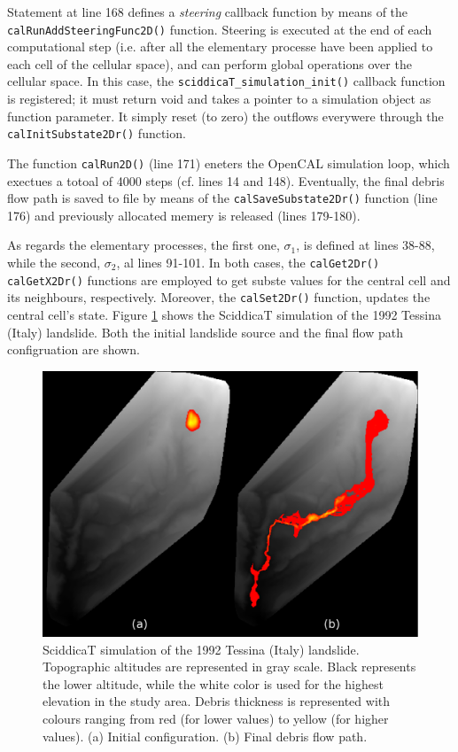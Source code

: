 Statement at line 168 defines a \emph{steering} callback function by
means of the \verb'calRunAddSteeringFunc2D()' function. Steering is
executed at the end of each computational step (i.e. after all the
elementary processe have been applied to each cell of the cellular
space), and can perform global operations over the cellular space. In
this case, the \verb'sciddicaT_simulation_init()' callback function is
registered; it must return void and takes a pointer to a simulation
object as function parameter. It simply reset (to zero) the outflows
everywere through the \verb'calInitSubstate2Dr()' function.

The function \verb'calRun2D()' (line 171) eneters the OpenCAL
simulation loop, which exectues a totoal of 4000 steps (cf. lines 14
and 148). Eventually, the final debris flow path is saved to file by
means of the \verb'calSaveSubstate2Dr()' function (line 176) and
previously allocated memery is released (lines 179-180).

As regards the elementary processes, the first one, $\sigma_1$, is
defined at lines 38-88, while the second, $\sigma_2$, al lines
91-101. In both cases, the \verb'calGet2Dr()' \verb'calGetX2Dr()'
functions are employed to get subste values for the central cell and
its neighbours, respectively. Moreover, the \verb'calSet2Dr()'
function, updates the central cell's state. Figure \ref{fig:sciddicaT}
shows the SciddicaT simulation of the 1992 Tessina (Italy)
landslide. Both the initial landslide source and the final flow path
configruation are shown.

\begin{figure}[htbp]
  \centering
  \includegraphics[width=12cm]{./images/OpenCAL/sciddicaT}
  \caption{SciddicaT simulation of the 1992 Tessina (Italy)
    landslide. Topographic altitudes are represented in gray
    scale. Black represents the lower altitude, while the white color
    is used for the highest elevation in the study area. Debris
    thickness is represented with colours ranging from red (for lower
    values) to yellow (for higher values). (a) Initial
    configuration. (b) Final debris flow path.}
  \label{fig:sciddicaT}
\end{figure}

